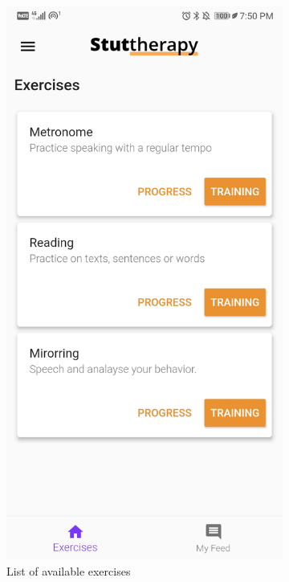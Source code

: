 \begin{appendices}
\begin{landscape}
\begin{figure}[h]
\begin{subfigure}{.25\textwidth}
    \includegraphics[width=.75\linewidth]{content/imgs/screen2.jpg}
    \caption{List of available exercises}
  \end{subfigure}%
  \begin{subfigure}{.25\textwidth}
    \centering

\end{subfigure}
\end{figure}
\end{landscape}
\end{appendices}
